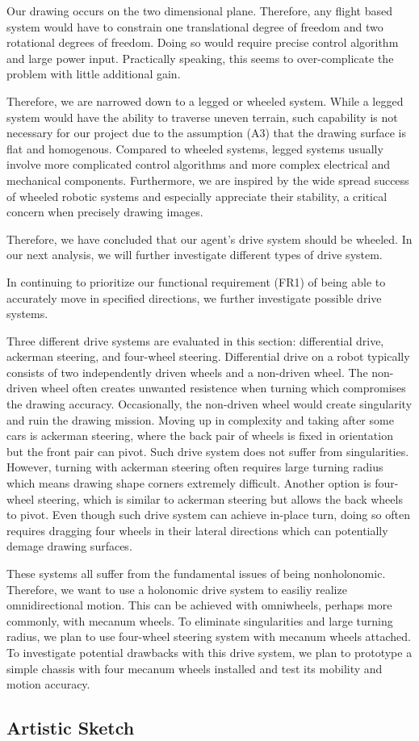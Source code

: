 Our drawing occurs on the two dimensional plane. Therefore, any flight based system would have to constrain one translational degree of freedom and two rotational degrees of freedom. Doing so would require precise control algorithm and large power input. Practically speaking, this seems to over-complicate the problem with little additional gain. 

Therefore, we are narrowed down to a legged or wheeled system. While a legged system would have the ability to traverse uneven terrain, such capability is not necessary for our project due to the assumption (A3) that the drawing surface is flat and homogenous. Compared to wheeled systems, legged systems usually involve more complicated control algorithms and more complex electrical and mechanical components. Furthermore, we are inspired by the wide spread success of wheeled robotic systems and especially appreciate their stability, a critical concern when precisely drawing images.

Therefore, we have concluded that our agent's drive system should be wheeled. In our next analysis, we will further investigate different types of drive system. 

In continuing to prioritize our functional requirement (FR1) of being able to accurately move in specified directions, we further investigate possible drive systems. 

Three different drive systems are evaluated in this section: differential drive, ackerman steering, and four-wheel steering. Differential drive on a robot typically consists of two independently driven wheels and a non-driven wheel. The non-driven wheel often creates unwanted resistence when turning which compromises the drawing accuracy. Occasionally, the non-driven wheel would create singularity and ruin the drawing mission. Moving up in complexity and taking after some cars is ackerman steering, where the back pair of wheels is fixed in orientation but the front pair can pivot. Such drive system does not suffer from singularities. However, turning with ackerman steering often requires large turning radius which means drawing shape corners extremely difficult. Another option is four-wheel steering, which is similar to ackerman steering but allows the back wheels to pivot. Even though such drive system can achieve in-place turn, doing so often requires dragging four wheels in their lateral directions which can potentially demage drawing surfaces.

These systems all suffer from the fundamental issues of being nonholonomic. Therefore, we want to use a holonomic drive system to easiliy realize omnidirectional motion. This can be achieved with omniwheels, perhaps more commonly, with mecanum wheels. To eliminate singularities and large turning radius, we plan to use four-wheel steering system with mecanum wheels attached. To investigate potential drawbacks with this drive system, we plan to prototype a simple chassis with four mecanum wheels installed and test its mobility and motion accuracy. 

\subsection{Artistic Sketch}